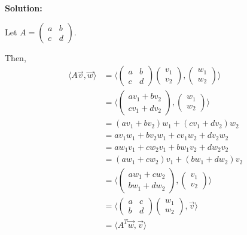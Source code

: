 \documentclass[12pt]{article}
\newenvironment{solution}{
    \textbf{Solution:}
    
}{
    
    \vspace{2em}
}
\begin{document}
\begin{solution}
    Let \(A = \begin{pmatrix}
        a & b \\
        c & d
    \end{pmatrix}\).
    
    Then,
    \[
        \begin{aligned}
            \langle A\vec{v}, \vec{w} \rangle &= \langle \begin{pmatrix}
                a & b \\
                c & d
            \end{pmatrix} \begin{pmatrix}
                v_1 \\
                v_2
            \end{pmatrix}, \begin{pmatrix}
                w_1 \\
                w_2
            \end{pmatrix} \rangle\\
            &= \langle \begin{pmatrix}
                av_1 + bv_2 \\
                cv_1 + dv_2
            \end{pmatrix}, \begin{pmatrix}
                w_1 \\
                w_2
            \end{pmatrix} \rangle\\
            &= (av_1 + bv_2)w_1 + (cv_1 + dv_2)w_2\\
            &= av_1w_1 + bv_2w_1 + cv_1w_2 + dv_2w_2\\
            &= aw_1v_1 + cw_2v_1 + bw_1v_2 + dw_2v_2\\
            &= (aw_1 + cw_2)v_1 + (bw_1 + dw_2)v_2\\
            &= \langle \begin{pmatrix}
                aw_1 + cw_2 \\
                bw_1 + dw_2
            \end{pmatrix}, \begin{pmatrix}
                v_1 \\
                v_2
            \end{pmatrix} \rangle\\
            &= \langle \begin{pmatrix}
                a & c \\
                b & d
            \end{pmatrix} \begin{pmatrix}
                w_1 \\
                w_2
            \end{pmatrix}, \vec{v} \rangle\\
            &= \langle A^T\vec{w}, \vec{v} \rangle
        \end{aligned}
    \]
\end{solution}
\end{document}
